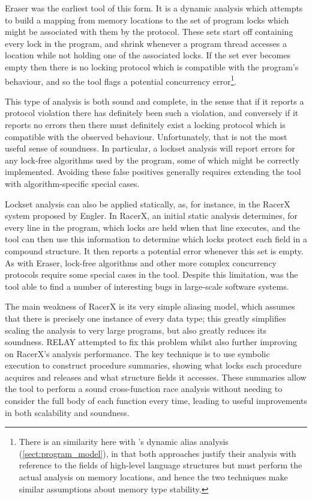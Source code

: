 Eraser\cite{Savage1997} was the earliest tool of this form.  It is a
dynamic analysis which attempts to build a mapping from memory
locations to the set of program locks which might be associated with
them by the protocol.  These sets start off containing every lock in
the program, and shrink whenever a program thread accesses a location
while not holding one of the associated locks.  If the set ever
becomes empty then there is no locking protocol which is compatible
with the program's behaviour, and so the tool flags a potential
concurrency error\footnote{There is an similarity here with
  {\technique}'s dynamic alias analysis
  (\autoref{sect:program_model}), in that both approaches justify
  their analysis with reference to the fields of high-level language
  structures but must perform the actual analysis on memory locations,
  and hence the two techniques make similar assumptions about memory
  type stability.}.

This type of analysis is both sound and complete, in the sense that if
it reports a protocol violation there has definitely been such a
violation, and conversely if it reports no errors then there must
definitely exist a locking protocol which is compatible with the
observed behaviour.  Unfortunately, that is not the most useful sense
of soundness.  In particular, a lockset analysis will report errors
for any lock-free algorithms used by the program, some of which might
be correctly implemented.  Avoiding these false positives generally
requires extending the tool with algorithm-specific special cases.

Lockset analysis can also be applied statically, as, for instance, in
the RacerX system proposed by Engler\cite{Engler2003}.  In RacerX, an
initial static analysis determines, for every line in the program,
which locks are held when that line executes, and the tool can then
use this information to determine which locks protect each field in a
compound structure.  It then reports a potential error whenever this
set is empty.  As with Eraser, lock-free algorithms and other more
complex concurrency protocols require some special cases in the tool.
Despite this limitation, was the tool able to find a number of
interesting bugs in large-scale software systems.

The main weakness of RacerX is its very simple aliasing model, which
assumes that there is precisely one instance of every data type; this
greatly simplifies scaling the analysis to very large programs, but
also greatly reduces its soundness.  RELAY\cite{Voung2007} attempted
to fix this problem whilst also further improving on RacerX's analysis
performance.  The key technique is to use symbolic execution to
construct procedure summaries\cite{Qadeer2004}, showing what locks
each procedure acquires and releases and what structure fields it
accesses.  These summaries allow the tool to perform a sound
cross-function race analysis without needing to consider the full body
of each function every time, leading to useful improvements in both
scalability and soundness.


